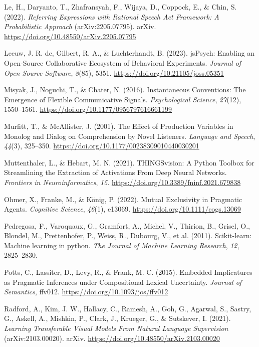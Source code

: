 \documentclass[10pt, letterpaper]{article}
\begin{document}
\begin{CSLReferences}{1}{0}
Le, H., Daryanto, T., Zhafransyah, F., Wijaya, D., Coppock, E., \& Chin,
S. (2022). \emph{Referring {Expressions} with {Rational Speech Act
Framework}: {A Probabilistic Approach}} (arXiv:2205.07795). arXiv.
\url{https://doi.org/10.48550/arXiv.2205.07795}

Leeuw, J. R. de, Gilbert, R. A., \& Luchterhandt, B. (2023). {jsPsych}:
{Enabling} an {Open-Source Collaborative Ecosystem} of {Behavioral
Experiments}. \emph{Journal of Open Source Software}, \emph{8}(85),
5351. \url{https://doi.org/10.21105/joss.05351}

Misyak, J., Noguchi, T., \& Chater, N. (2016). Instantaneous
{Conventions}: {The Emergence} of {Flexible Communicative Signals}.
\emph{Psychological Science}, \emph{27}(12), 1550--1561.
\url{https://doi.org/10.1177/0956797616661199}

Murfitt, T., \& McAllister, J. (2001). The {Effect} of {Production
Variables} in {Monolog} and {Dialog} on {Comprehension} by {Novel
Listeners}. \emph{Language and Speech}, \emph{44}(3), 325--350.
\url{https://doi.org/10.1177/00238309010440030201}

Muttenthaler, L., \& Hebart, M. N. (2021). {THINGSvision}: {A Python
Toolbox} for {Streamlining} the {Extraction} of {Activations From Deep
Neural Networks}. \emph{Frontiers in Neuroinformatics}, \emph{15}.
\url{https://doi.org/10.3389/fninf.2021.679838}

Ohmer, X., Franke, M., \& König, P. (2022). Mutual {Exclusivity} in
{Pragmatic Agents}. \emph{Cognitive Science}, \emph{46}(1), e13069.
\url{https://doi.org/10.1111/cogs.13069}

Pedregosa, F., Varoquaux, G., Gramfort, A., Michel, V., Thirion, B.,
Grisel, O., Blondel, M., Prettenhofer, P., Weiss, R., Dubourg, V., et
al. (2011). Scikit-learn: {Machine} learning in python. \emph{The
Journal of Machine Learning Research}, \emph{12}, 2825--2830.

Potts, C., Lassiter, D., Levy, R., \& Frank, M. C. (2015). Embedded
{Implicatures} as {Pragmatic Inferences} under {Compositional Lexical
Uncertainty}. \emph{Journal of Semantics}, ffv012.
\url{https://doi.org/10.1093/jos/ffv012}

Radford, A., Kim, J. W., Hallacy, C., Ramesh, A., Goh, G., Agarwal, S.,
Sastry, G., Askell, A., Mishkin, P., Clark, J., Krueger, G., \&
Sutskever, I. (2021). \emph{Learning {Transferable Visual Models From
Natural Language Supervision}} (arXiv:2103.00020). arXiv.
\url{https://doi.org/10.48550/arXiv.2103.00020}


\end{CSLReferences}
\end{document}
